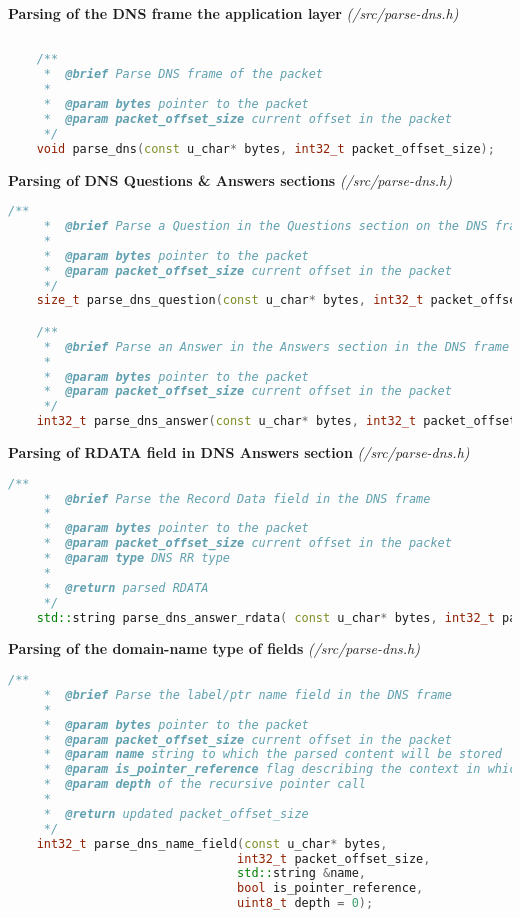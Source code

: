 \vspace{1cm}
\textbf{Parsing of the DNS frame the application layer} \textit{(/src/parse-dns.h)}
\begin{lstlisting}[language=C++] 
   
    /**
     *  @brief Parse DNS frame of the packet
     * 
     *  @param bytes pointer to the packet
     *  @param packet_offset_size current offset in the packet
     */
    void parse_dns(const u_char* bytes, int32_t packet_offset_size);

\end{lstlisting}

\pagebreak

\vspace{1cm}
\textbf{Parsing of DNS Questions \& Answers sections} \textit{(/src/parse-dns.h)}
\begin{lstlisting}[language=C++] 
    /**
     *  @brief Parse a Question in the Questions section on the DNS frame of the packet
     * 
     *  @param bytes pointer to the packet
     *  @param packet_offset_size current offset in the packet
     */
    size_t parse_dns_question(const u_char* bytes, int32_t packet_offset_size);

    /**
     *  @brief Parse an Answer in the Answers section in the DNS frame of the packet
     * 
     *  @param bytes pointer to the packet
     *  @param packet_offset_size current offset in the packet
     */
    int32_t parse_dns_answer(const u_char* bytes, int32_t packet_offset_size);
\end{lstlisting}

\vspace{1cm}
\textbf{Parsing of RDATA field in DNS Answers section} \textit{(/src/parse-dns.h)}
\begin{lstlisting}[language=C++] 
    /**
     *  @brief Parse the Record Data field in the DNS frame 
     * 
     *  @param bytes pointer to the packet
     *  @param packet_offset_size current offset in the packet
     *  @param type DNS RR type 
     *  
     *  @return parsed RDATA
     */
    std::string parse_dns_answer_rdata( const u_char* bytes, int32_t packet_offset_size, uint16_t rdata_length, uint16_t type);
\end{lstlisting}

\vspace{1cm}
\textbf{Parsing of the domain-name type of fields} \textit{(/src/parse-dns.h)}
\begin{lstlisting}[language=C++]
    /**
     *  @brief Parse the label/ptr name field in the DNS frame
     * 
     *  @param bytes pointer to the packet
     *  @param packet_offset_size current offset in the packet
     *  @param name string to which the parsed content will be stored
     *  @param is_pointer_reference flag describing the context in which the name parsing is run
     *  @param depth of the recursive pointer call
     * 
     *  @return updated packet_offset_size
     */
    int32_t parse_dns_name_field(const u_char* bytes, 
                                int32_t packet_offset_size, 
                                std::string &name, 
                                bool is_pointer_reference,
                                uint8_t depth = 0);
\end{lstlisting}

